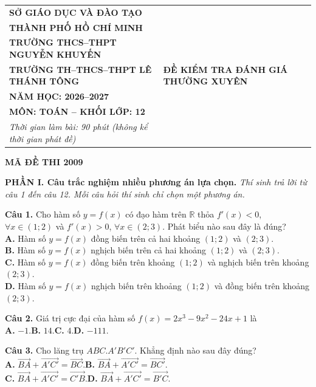 \documentclass[12pt,a4paper]{article}
\begin{document}
\noindent
\begin{tabular}{@{}p{8cm}p{9cm}@{}}
\centering \textbf{SỞ GIÁO DỤC VÀ ĐÀO TẠO} \\
\centering \textbf{THÀNH PHỐ HỒ CHÍ MINH} \\
\centering \textbf{TRƯỜNG THCS--THPT NGUYỄN KHUYẾN} \\
\centering \textbf{TRƯỜNG TH--THCS--THPT LÊ THÁNH TÔNG} &
\centering \textbf{ĐỀ KIỂM TRA ĐÁNH GIÁ THƯỜNG XUYÊN} \\
\centering \textbf{NĂM HỌC: 2026--2027} \\
\centering \textbf{MÔN: TOÁN -- KHỐI LỚP: 12} \\
\centering \textit{Thời gian làm bài: 90 phút (không kể thời gian phát đề)}
\end{tabular}

\begin{center}
\textbf{\large MÃ ĐỀ THI 2009}
\end{center}

\vspace{0.2cm}
\noindent\textbf{\large PHẦN I. Câu trắc nghiệm nhiều phương án lựa chọn.} \textit{Thí sinh trả lời từ câu 1 đến câu 12. Mỗi câu hỏi thí sinh chỉ chọn một phương án.}

\vspace{0.2cm}
\textbf{Câu 1.} Cho hàm số $y = f(x)$ có đạo hàm trên $\mathbb{R}$ thỏa $f'(x) < 0$, $\forall x \in (1; 2)$ và $f'(x) > 0$, $\forall x \in (2; 3)$. Phát biểu nào sau đây là đúng?\\
\textbf{A.} Hàm số $y = f(x)$ đồng biến trên cả hai khoảng $(1; 2)$ và $(2; 3)$.\\
\textbf{B.} Hàm số $y = f(x)$ nghịch biến trên cả hai khoảng $(1; 2)$ và $(2; 3)$.\\
\textbf{C.} Hàm số $y = f(x)$ đồng biến trên khoảng $(1; 2)$ và nghịch biến trên khoảng $(2; 3)$.\\
\textbf{D.} Hàm số $y = f(x)$ nghịch biến trên khoảng $(1; 2)$ và đồng biến trên khoảng $(2; 3)$.

\vspace{0.2cm}
\textbf{Câu 2.} Giá trị cực đại của hàm số $f(x) = 2x^3 - 9x^2 - 24x + 1$ là\\
\textbf{A.} $-1$.\hspace{3cm}\textbf{B.} $14$.\hspace{3cm}\textbf{C.} $4$.\hspace{3cm}\textbf{D.} $-111$.

\vspace{0.2cm}
\textbf{Câu 3.} Cho lăng trụ $ABC.A'B'C'$. Khẳng định nào sau đây đúng?\\
\textbf{A.} $\overrightarrow{BA} + \overrightarrow{A'C'} = \overrightarrow{BC}$.\hspace{3cm}\textbf{B.} $\overrightarrow{BA} + \overrightarrow{A'C'} = \overrightarrow{BC'}$.\\
\textbf{C.} $\overrightarrow{BA} + \overrightarrow{A'C'} = \overrightarrow{C'B}$.\hspace{3cm}\textbf{D.} $\overrightarrow{BA} + \overrightarrow{A'C'} = \overrightarrow{B'C}$.
\end{document}
